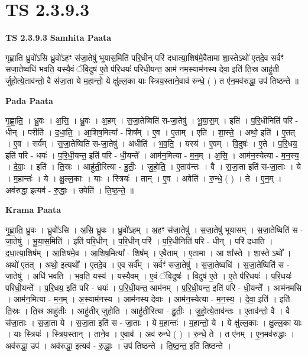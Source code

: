 \documentclass[17pt]{extarticle}
\begin{document}
\section{ TS 2.3.9.3 }

\textbf{TS 2.3.9.3 } \newline
\textbf{Samhita Paata} \newline

गृह्णाति ध्रु॒वो॑ऽसि ध्रु॒वो॑ऽहꣳ स॑जा॒तेषु॑ भूयास॒मिति॑ परि॒धीन् परि॑ दधात्या॒शिष॑मे॒वैतामा शा॒स्तेऽथो॑ ए॒तदे॒व सर्वꣳ॑ सजा॒तेष्वधि॑ भवति॒ यस्यै॒वं ॅवि॒दुष॑ ए॒ते प॑रि॒धयः॑ परिधी॒यन्त॒ आम॑ नम॒स्याम॑नस्य देवा॒ इति॑ ति॒स्र आहु॑ती र्जुहोत्ये॒ताव॑न्तो॒ वै स॑जा॒ता ये म॒हान्तो॒ ये क्षु॑ल्ल॒का याः स्त्रिय॒स्ताने॒वाव॑ रुन्धे॒ ( ) त ए॑न॒मव॑रुद्धा॒ उप॑ तिष्ठन्ते ॥ \newline

\textbf{Pada Paata} \newline

गृ॒ह्णा॒ति॒ । ध्रु॒वः । अ॒सि॒ । ध्रु॒वः । अ॒हम् । स॒जा॒तेष्विति॑ स-जा॒तेषु॑ । भू॒या॒स॒म् । इति॑ । प॒रि॒धीनिति॑ परि - धीन् । परीति॑ । द॒धा॒ति॒ । आ॒शिष॒मित्या᳚ - शिष᳚म् । ए॒व । ए॒ताम् । एति॑ । शा॒स्ते॒ । अथो॒ इति॑ । ए॒तत् । ए॒व । सर्व᳚म् । स॒जा॒तेष्विति॑ स-जा॒तेषु॑ । अधीति॑ । भ॒व॒ति॒ । यस्य॑ । ए॒वम् । वि॒दुषः॑ । ए॒ते । प॒रि॒धय॒ इति॑ परि - धयः॑ । प॒रि॒धी॒यन्त॒ इति॑ परि - धी॒यन्ते᳚ । आम॑न॒मित्या - म॒न॒म् । अ॒सि॒ । आम॑न॒स्येत्या - म॒न॒स्य॒ । दे॒वाः॒ । इति॑ । ति॒स्रः । आहु॑ती॒रित्या - हु॒तीः॒ । जु॒हो॒ति॒ । ए॒ताव॑न्तः । वै । स॒जा॒ता इति॑ स-जा॒ताः । ये । म॒हान्तः॑ । ये । क्षु॒ल्ल॒काः । याः । स्त्रियः॑ । तान् ।  ए॒व । अवेति॑ । रु॒न्धे॒ ( ) । ते । ए॒न॒म् । अव॑रुद्धा॒ इत्यव॑ - रु॒द्धाः॒ । उपेति॑ । ति॒ष्ठ॒न्ते॒ ॥  \newline


\textbf{Krama Paata} \newline

गृ॒ह्णा॒ति॒ ध्रु॒वः । ध्रु॒वो॑ऽसि । अ॒सि॒ ध्रु॒वः । ध्रु॒वो॑ऽहम् । अ॒हꣳ स॑जा॒तेषु॑ । स॒जा॒तेषु॑ भूयासम् । स॒जा॒तेष्विति॑ स - जा॒तेषु॑ । भू॒या॒स॒मिति॑ । इति॑ परि॒धीन् । प॒रि॒धीन् परि॑ । प॒रि॒धीनिति॑ परि - धीन् । परि॑ दधाति । द॒धा॒त्या॒शिष᳚म् । आ॒शिष॑मे॒व । आ॒शिष॒मित्या᳚ - शिष᳚म् । ए॒वैताम् । ए॒तामा । आ शा᳚स्ते । शा॒स्ते ऽथो᳚ । अथो॑ ए॒तत् । अथो॒ इत्यथो᳚ । ए॒तदे॒व । ए॒व सर्व᳚म् । सर्वꣳ॑ सजा॒तेषु॑ । स॒जा॒तेष्वधि॑ । स॒जा॒तेष्विति॑ स - जा॒तेषु॑ । अधि॑ भवति । भ॒व॒ति॒ यस्य॑ । यस्यै॒वम् । ए॒वं ॅवि॒दुषः॑ । वि॒दुष॑ ए॒ते । ए॒ते प॑रि॒धयः॑ । प॒रि॒धयः॑ परिधी॒यन्ते᳚ । प॒रि॒धय॒ इति॑ परि - धयः॑ । प॒रि॒धी॒यन्त॒ आम॑नम् । प॒रि॒धी॒यन्त॒ इति॑ परि - धी॒यन्ते᳚ । आम॑नमसि । आम॑न॒मित्या - म॒न॒म् । अ॒स्याम॑नस्य । आम॑नस्य देवाः । आम॑न॒स्येत्या - म॒न॒स्य॒ । दे॒वा॒ इति॑ । इति॑ ति॒स्रः । ति॒स्र आहु॑तीः । आहु॑तीर् जुहोति । आहु॑ती॒रित्या - हु॒तीः॒ । जु॒हो॒त्ये॒ताव॑न्तः । ए॒ताव॑न्तो॒ वै । वै स॑जा॒ताः । स॒जा॒ता ये । स॒जा॒ता इति॑ स - जा॒ताः । ये म॒हान्तः॑ । म॒हान्तो॒ ये । ये क्षु॑ल्ल॒काः । क्षु॒ल्ल॒का याः । याः स्त्रियः॑ । स्त्रिय॒स्तान् । ताने॒व । ए॒वाव॑ । अव॑ रुन्धे ( ) । रु॒न्धे॒ ते । त ए॑नम् । ए॒न॒मव॑रुद्धाः । अव॑रुद्धा॒ उप॑ । अव॑रुद्धा॒ इत्यव॑ - रु॒द्धाः॒ । उप॑ तिष्ठन्ते । ति॒ष्ठ॒न्त॒ इति॑ तिष्ठन्ते । \newline
\end{document}
